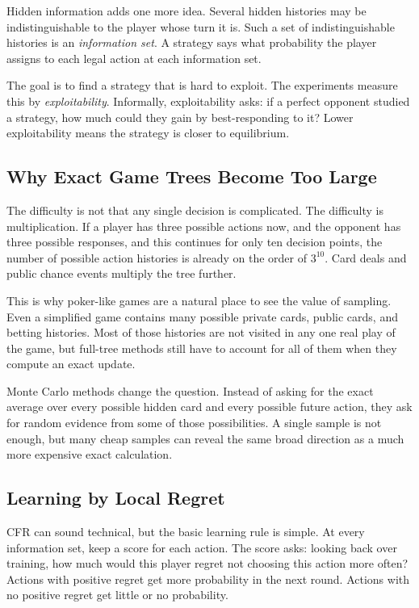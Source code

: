 \documentclass[11pt,reqno,twoside]{article}
\theoremstyle{myThm}
\theoremstyle{myRem}
\theoremstyle{myDef}
\numberwithin{equation}{section}
\begin{document}
Hidden information adds one more idea. Several hidden histories may be
indistinguishable to the player whose turn it is. Such a set of
indistinguishable histories is an \emph{information set}. A strategy says
what probability the player assigns to each legal action at each
information set.

The goal is to find a strategy that is hard to exploit. The experiments
measure this by \emph{exploitability}. Informally, exploitability asks:
if a perfect opponent studied a strategy, how much could they gain by
best-responding to it? Lower exploitability means the strategy is closer
to equilibrium.

\subsection{Why Exact Game Trees Become Too Large}

The difficulty is not that any single decision is complicated. The
difficulty is multiplication. If a player has three possible actions now,
and the opponent has three possible responses, and this continues for only
ten decision points, the number of possible action histories is already on
the order of $3^{10}$. Card deals and public chance events multiply the
tree further.

This is why poker-like games are a natural place to see the value of
sampling. Even a simplified game contains many possible private cards,
public cards, and betting histories. Most of those histories are not
visited in any one real play of the game, but full-tree methods still have
to account for all of them when they compute an exact update.

Monte Carlo methods change the question. Instead of asking for the exact
average over every possible hidden card and every possible future action,
they ask for random evidence from some of those possibilities. A single
sample is not enough, but many cheap samples can reveal the same broad
direction as a much more expensive exact calculation.

\subsection{Learning by Local Regret}

CFR can sound technical, but the basic learning rule is simple. At every
information set, keep a score for each action. The score asks: looking
back over training, how much would this player regret not choosing this
action more often? Actions with positive regret get more probability in
the next round. Actions with no positive regret get little or no
probability.
\end{document}
